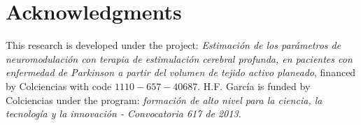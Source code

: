 \documentclass[twoside]{article}
\begin{document}
\section*{Acknowledgments}
This research is developed under the project: \textit{Estimación de los parámetros de neuromodulación con terapia de estimulación cerebral profunda, en pacientes con enfermedad de Parkinson a partir del volumen de tejido activo planeado}, financed by Colciencias with code $1110-657-40687$. H.F. Garc\'ia is funded by Colciencias under the program: \textit{formaci\'on de alto nivel para la ciencia, la tecnolog\'ia y la innovaci\'on - Convocatoria 617 de 2013.}



\end{document}
